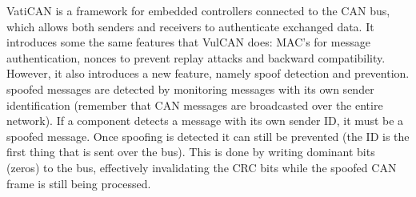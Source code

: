 VatiCAN is a framework for embedded controllers connected to the CAN bus, which allows both senders and receivers to authenticate exchanged data. It introduces some the same features that VulCAN does: MAC's for message authentication, nonces to prevent replay attacks and backward compatibility. However, it also introduces a new feature, namely spoof detection and prevention. spoofed messages are detected by monitoring messages with its own sender identification (remember that CAN messages are broadcasted over the entire network). If a component detects a message with its own sender ID, it must be a spoofed message. Once spoofing is detected it can still be prevented (the ID is the first thing that is sent over the bus). This is done by writing dominant bits (zeros) to the bus, effectively invalidating the CRC bits while the spoofed CAN frame is still being processed.\cite{VatiCAN}